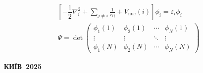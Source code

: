 {\begin{alwayssingle}
\begin{center}
\begin{tcolorbox}
{						] (title) at (frame.north) {С.~М. Пономаренко
					};
				}
			]
			\centering
			\Huge\sffamily\bfseries\textcolor{white}{\realtitle}\\
			\huge\sffamily\bfseries\textcolor{white}{\subtitle}
			\end{tcolorbox}
			\vfill
		 	\begin{Large}\color{themecolordark!90!black}
            \begin{gather*}
                \left[-\dfrac{1}{2}\nabla_i^2 + \sum_{j\neq i} \frac{1}{r_{ij}} + V_{\text{nuc}}(i)\right]\phi_i = \varepsilon_i \phi_i \\
                \Psi = \det\begin{pmatrix}
                    \phi_1(1) & \phi_2(1) & \cdots & \phi_N(1) \\
                    \vdots & \vdots & \ddots & \vdots \\
                    \phi_1(N) & \phi_2(N) & \cdots & \phi_N(N)
                \end{pmatrix}
            \end{gather*}
			\end{Large}
			\vfill
			\begin{tcolorbox}[titlepagestyle,
					toprule=0.10cm,
					bottomrule=0.10cm]
				\begin{center}\color{white}\bfseries\normalsize
					\MakeUppercase{Київ~2025} \\
				\end{center}
			\end{tcolorbox}
		\end{center}
		\clearpage
	\end{alwayssingle}
\setcounter{page}{1}
}


%
%

